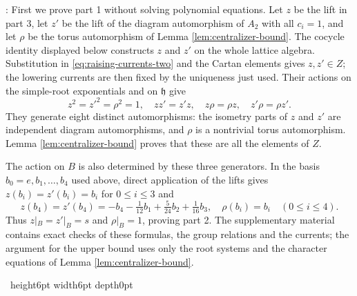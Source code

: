 \documentclass[leqno]{article}
\renewcommand{\leq}{\ensuremath{\leqslant}}
\newcommand{\qed}{\hfill \vrule height6pt  width6pt depth0pt}
\newenvironment{proof}[1][]{\noindent {\it Proof #1} : }{\hbox{~}\qed
\smallskip
}
\numberwithin{equation}{section}
\begin{document}
\begin{proof}
First we prove part 1 without solving polynomial equations. Let $z$ be the lift in part 3, let $z'$ be the lift of the diagram automorphism of $A_2$ with all $c_i = 1$, and let $\rho$ be the torus automorphism of Lemma \ref{lem:centralizer-bound}. The cocycle identity displayed below constructs $z$ and $z'$ on the whole lattice algebra. Substitution in \eqref{eq:raising-currents-two} and the Cartan elements gives $z,z' \in Z$; the lowering currents are then fixed by the uniqueness just used. Their actions on the simple-root exponentials and on $\mathfrak h$ give
\[
z^2 = z'^2 = \rho^2 = 1, \quad zz' = z'z, \quad z\rho = \rho z, \quad z'\rho = \rho z'.
\]
They generate eight distinct automorphisms: the isometry parts of $z$ and $z'$ are independent diagram automorphisms, and $\rho$ is a nontrivial torus automorphism. Lemma \ref{lem:centralizer-bound} proves that these are all the elements of $Z$.

The action on $B$ is also determined by these three generators. In the basis $b_0 = e,b_1,\ldots,b_4$ used above, direct application of the lifts gives $z(b_i) = z'(b_i) = b_i$ for $0 \leq i \leq 3$ and
\[
z(b_4) = z'(b_4) = -b_4-\tfrac1{12}b_1+\tfrac5{24}b_2+\tfrac1{16}b_3,
\quad \rho(b_i) = b_i \quad (0 \leq i \leq 4).
\]
Thus $z|_B = z'|_B = s$ and $\rho|_B = 1$, proving part 2. The supplementary material contains exact checks of these formulas, the group relations and the currents; the argument for the upper bound uses only the root systems and the character equations of Lemma \ref{lem:centralizer-bound}.


\end{proof}
\end{document}
